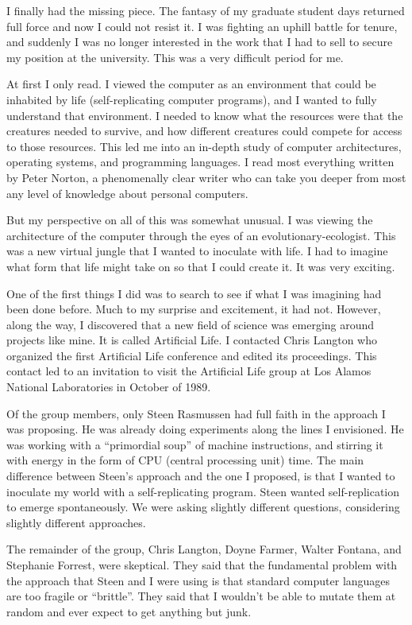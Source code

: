 I finally had the missing piece.  The fantasy of my graduate student days
returned full force and now I could not resist it.  I was fighting an
uphill battle for tenure, and suddenly I was no longer interested in the work
that I had to sell to secure my position at the university.  This was a very
difficult period for me.

At first I only read.  I viewed the computer as an environment that could
be inhabited by life (self-replicating computer programs), and I wanted to
fully understand that environment.  I needed to know what the resources were
that the creatures needed to survive, and how different creatures could compete
for access to those resources.  This led me into an in-depth study of
computer architectures, operating systems, and programming languages.  I read
most everything written by Peter Norton, a phenomenally clear writer who can
take you deeper from most any level of knowledge about personal computers.

But my perspective on all of this was somewhat unusual.  I was viewing the
architecture of the computer through the eyes of an evolutionary-ecologist.
This was a new virtual jungle that I wanted to inoculate with life.  I had
to imagine what form that life might take on so that I could create it.
It was very exciting.

One of the first things I did was to search to see if what I was imagining
had been done before.  Much to my surprise and excitement, it had not.
However, along the way, I discovered that a new field of science was emerging
around projects like mine.  It is called Artificial Life.  I contacted
Chris Langton who organized the first Artificial Life conference and edited
its proceedings.  This contact led to an invitation to visit the Artificial
Life group at Los Alamos National Laboratories in October of 1989.

Of the group members, only Steen Rasmussen had full faith in the approach
I was proposing.  He was already doing experiments along the lines I
envisioned.  He was working with a ``primordial soup'' of machine instructions,
and stirring it with energy in the form of CPU (central processing unit) time.
The main difference between Steen's approach and the one I proposed, is that
I wanted to inoculate my world with a self-replicating program.  Steen wanted
self-replication to emerge spontaneously.  We were asking slightly different
questions, considering slightly different approaches.

The remainder of the group, Chris Langton, Doyne Farmer, Walter Fontana, and
Stephanie Forrest, were skeptical.  They said that the fundamental problem
with the approach that Steen and I were using is that standard computer
languages are too fragile or ``brittle''.  They said that I wouldn't be able
to mutate them at random and ever expect to get anything but junk.

